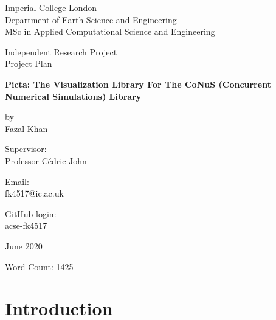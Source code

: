 \documentclass[12pt]{article}
\begin{document}
	\begin{titlepage}
		\begin{center}
			\vspace*{1cm}
			
			Imperial College London \\
			Department of Earth Science and Engineering \\
			MSc in Applied Computational Science and Engineering
			
			\vspace{1cm}
			
			Independent Research Project \\
			Project Plan
			
			\vspace{1cm}
			
			{\fontsize{18}{104}\selectfont \textbf{Picta: The Visualization Library For The CoNuS (Concurrent Numerical Simulations) Library}}
			
			\vspace{1cm}
			
			by \\ 
			Fazal Khan
			
			\vspace{1cm}
			
			Supervisor: \\
			Professor Cédric John
			
			\vspace{1cm}
			
			Email: \\
			fk4517@ic.ac.uk
			
			\vspace{1cm}
			
			GitHub login: \\
			acse-fk4517
			
			\vspace{1.0cm}
			
			June 2020
			
			\vspace{1.0cm}
			
			Word Count: 1425
			
		\end{center}
	\end{titlepage}	
	\section{Introduction}
	
\end{document}
